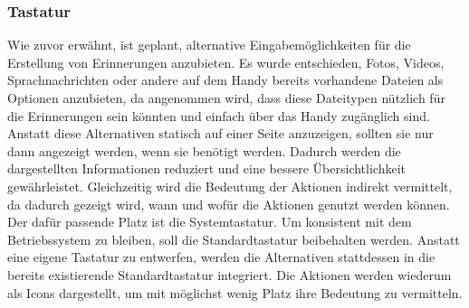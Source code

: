\subsubsection{Tastatur}%
Wie zuvor erwähnt, ist geplant, alternative Eingabemöglichkeiten für die Erstellung von Erinnerungen anzubieten. Es wurde entschieden, Fotos, Videos, Sprachnachrichten oder andere auf dem Handy bereits vorhandene Dateien als Optionen anzubieten, da angenommen wird, dass diese Dateitypen nützlich für die Erinnerungen sein könnten und einfach über das Handy zugänglich sind.\newline%
Anstatt diese Alternativen statisch auf einer Seite anzuzeigen, sollten sie nur dann angezeigt werden, wenn sie benötigt werden. Dadurch werden die dargestellten Informationen reduziert und eine bessere Übersichtlichkeit gewährleistet. Gleichzeitig wird die Bedeutung der Aktionen indirekt vermittelt, da dadurch gezeigt wird, wann und wofür die Aktionen genutzt werden können. Der dafür passende Platz ist die Systemtastatur.\newline%
Um konsistent mit dem Betriebssystem zu bleiben, soll die Standardtastatur beibehalten werden. Anstatt eine eigene Tastatur zu entwerfen, werden die Alternativen stattdessen in die bereits existierende Standardtastatur integriert.\newline%
Die Aktionen werden wiederum als Icons dargestellt, um mit möglichst wenig Platz ihre Bedeutung zu vermitteln.%
